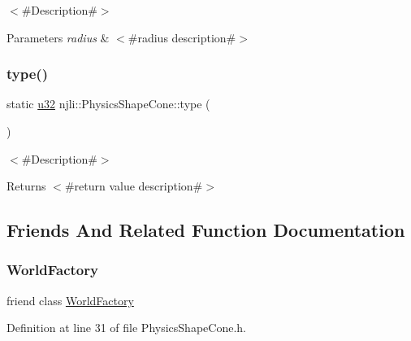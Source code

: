 $<$\#\+Description\#$>$


\begin{DoxyParams}{Parameters}
{\em radius} & $<$\#radius description\#$>$ \\
\hline
\end{DoxyParams}
\mbox{\label{classnjli_1_1_physics_shape_cone_a8d8bb8d53ec48270be2bf51806ff912f}} 
\subsubsection{\texorpdfstring{type()}{type()}}
{\footnotesize\ttfamily static \mbox{\hyperlink{_util_8h_a10e94b422ef0c20dcdec20d31a1f5049}{u32}} njli\+::\+Physics\+Shape\+Cone\+::type (\begin{DoxyParamCaption}{ }\end{DoxyParamCaption})\hspace{0.3cm}{\ttfamily [static]}}

$<$\#\+Description\#$>$

\begin{DoxyReturn}{Returns}
$<$\#return value description\#$>$ 
\end{DoxyReturn}


\subsection{Friends And Related Function Documentation}
\mbox{\label{classnjli_1_1_physics_shape_cone_acb96ebb09abe8f2a37a915a842babfac}} 
\subsubsection{\texorpdfstring{World\+Factory}{WorldFactory}}
{\footnotesize\ttfamily friend class \mbox{\hyperlink{classnjli_1_1_world_factory}{World\+Factory}}\hspace{0.3cm}{\ttfamily [friend]}}



Definition at line 31 of file Physics\+Shape\+Cone.\+h.



